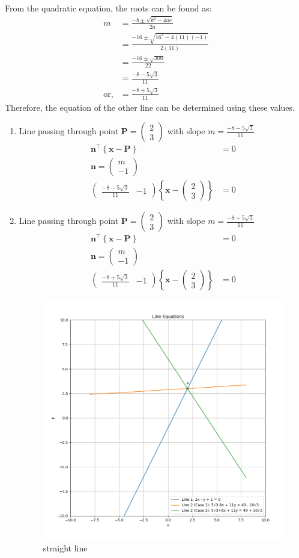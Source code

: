 \documentclass[10pt]{article}
\newcommand{\myvec}[1]{\ensuremath{\begin{pmatrix}#1\end{pmatrix}}}
\let\vec\mathbf
\providecommand{\cbrak}[1]{\ensuremath{\left\{#1\right\}}}
\let\vec\mathbf
\renewcommand{\vec}[1]{\textbf{#1}}
\begin{document}
From the quadratic equation, the roots can be found as:
\begin{align}
m &= \frac{-b \pm \sqrt{b^2 - 4ac}}{2a} \\
 &= \frac{-16 \pm \sqrt{16^2 - 4(11)(-1)}}{2(11)} \\
  &= \frac{-16 \pm \sqrt{300}}{22} \\
  &= \frac{-8 - 5\sqrt{3}}{11} \\
\text{or,}  &= \frac{-8 + 5\sqrt{3}}{11} 
\end{align}
Therefore, the equation of the other line can be determined using these values.
\\
\begin{enumerate}
\item Line passing through point  $\vec{P} = \myvec{ 2 \\ 3 }$ with slope $m=\frac{-8 - 5\sqrt{3}}{11}$
\begin{align}
    \vec{n}^\top\cbrak{{\vec{x}-\vec{P}}}&= 0 \\
    \vec{n} = \myvec{ m \\ -1 } \\
    \myvec{ \frac{-8 - 5\sqrt{3}}{11} & -1 }\cbrak{\vec{x}-\myvec{ 2 \\ 3 }} &= 0
\end{align}
\item  Line passing through point $\vec{P} = \myvec{ 2 \\ 3 }$ with slope $m =\frac{-8 + 5\sqrt{3}}{11}$
\begin{align}
\vec{n}^\top\cbrak{{\vec{x}-\vec{P}}}&= 0 \\
    \vec{n} = \myvec{ m \\ -1 } \\
    \myvec{ \frac{-8 + 5\sqrt{3}}{11} & -1 }\cbrak{\vec{x}-\myvec{ 2 \\ 3 }} &= 0
\end{align}

\begin{figure}
    \centering
    \includegraphics[width=\columnwidth]{figs/line.png}
    \caption{straight line}
    \label{fig:enter-label}
\end{figure}
\end{enumerate}
\end{document}
